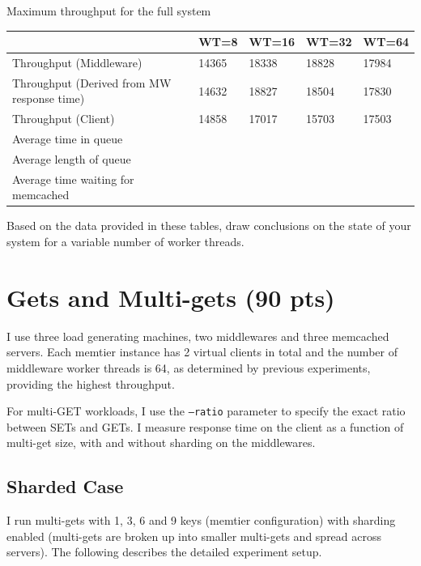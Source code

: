 \documentclass[11pt,a4paper]{article}
\begin{document}
\begin{center}
	{Maximum throughput for the full system}
	\begin{tabular}{|l|p{1.5cm}|p{1.5cm}|p{1.5cm}|p{1.5cm}|}
		\hline                                            & WT=8 & WT=16 & WT=32 & WT=64 \\ 
		\hline Throughput (Middleware)                    & 14365 & 18338 & 18828 & 17984 \\ 
		\hline Throughput (Derived from MW response time) & 14632 & 18827 & 18504 & 17830  \\ 
		\hline Throughput (Client)                     &14858 & 17017 & 15703 & 17503 \\ 
		\hline Average time in queue                      &      &       &       &       \\ 
		\hline Average length of queue                    &      &       &       &       \\ 
		\hline Average time waiting for memcached         &      &       &       &       \\ 
		\hline 
	\end{tabular}
\end{center}

Based on the data provided in these tables, draw conclusions on the state of your system for a variable number of worker threads.

\section{Gets and Multi-gets (90 pts)}

I use three load generating machines, two middlewares and three memcached servers. Each memtier instance has 2 virtual clients in total and the number of middleware worker threads is 64, as determined by previous experiments, providing the highest throughput.

For multi-GET workloads, I use the \texttt{--ratio} parameter to specify the exact ratio between SETs and GETs. I measure response time on the client as a function of multi-get size, with and without sharding on the middlewares.

\subsection{Sharded Case}

I run multi-gets with 1, 3, 6 and 9 keys (memtier configuration) with sharding enabled (multi-gets are broken up into smaller multi-gets and spread across servers). 
The following describes the detailed experiment setup.
\end{document}
